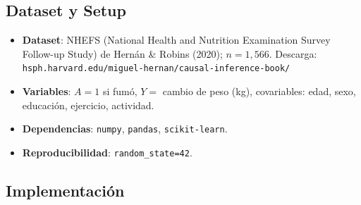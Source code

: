 \subsection*{Dataset y Setup}

\begin{itemize}
  \item \textbf{Dataset}: NHEFS (National Health and Nutrition Examination
    Survey Follow-up Study) de Hernán \& Robins (2020); $n=1{,}566$.
    Descarga: \texttt{hsph.harvard.edu/miguel-hernan/causal-inference-book/}
  \item \textbf{Variables}: $A=1$ si fumó, $Y=$ cambio de peso (kg),
    covariables: edad, sexo, educación, ejercicio, actividad.
  \item \textbf{Dependencias}: \texttt{numpy}, \texttt{pandas},
    \texttt{scikit-learn}.
  \item \textbf{Reproducibilidad}: \texttt{random\_state=42}.
\end{itemize}

\subsection*{Implementación}


